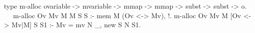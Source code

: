   type m-alloc ovariable -> mvariable -> mmap -> mmap -> 
    subst -> subst -> o.                            ~~
  m-alloc Ov Mv M M S S :- mem M (Ov <-> Mv), !.
  m-alloc Ov Mv M [Ov <-> Mv|M] S S1 :- Mv = mv N _, new S N S1.
